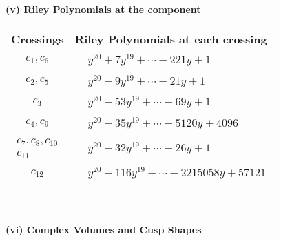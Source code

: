 \documentclass[1p]{elsarticle_modified}
\theoremstyle{definition}
\begin{document}
\newpage\renewcommand{\arraystretch}{1}
\flushleft \textbf{(v) Riley Polynomials at the component}\newline \\
\begin{tabular}{m{50pt}|m{274pt}}
Crossings & \hspace{64pt}Riley Polynomials at each crossing \\
\hline $$\begin{aligned}c_{1},c_{6}\end{aligned}$$&$\begin{aligned}
&y^{20}+7 y^{19}+\cdots-221 y+1
\end{aligned}$\\
\hline $$\begin{aligned}c_{2},c_{5}\end{aligned}$$&$\begin{aligned}
&y^{20}-9 y^{19}+\cdots-21 y+1
\end{aligned}$\\
\hline $$\begin{aligned}c_{3}\end{aligned}$$&$\begin{aligned}
&y^{20}-53 y^{19}+\cdots-69 y+1
\end{aligned}$\\
\hline $$\begin{aligned}c_{4},c_{9}\end{aligned}$$&$\begin{aligned}
&y^{20}-35 y^{19}+\cdots-5120 y+4096
\end{aligned}$\\
\hline $$\begin{aligned}c_{7},c_{8},c_{10}\\c_{11}\end{aligned}$$&$\begin{aligned}
&y^{20}-32 y^{19}+\cdots-26 y+1
\end{aligned}$\\
\hline $$\begin{aligned}c_{12}\end{aligned}$$&$\begin{aligned}
&y^{20}-116 y^{19}+\cdots-2215058 y+57121
\end{aligned}$\\
\hline
\end{tabular}\\~\\
\newpage\flushleft \textbf{(vi) Complex Volumes and Cusp Shapes}
\end{document}

